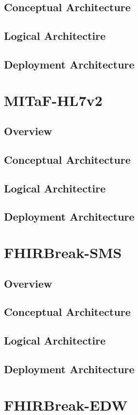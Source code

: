 \documentclass[a4paper]{book}
\begin{document}
\section{Conceptual Architecture}
\section{Logical Architectire}
\section{Deployment Architecture}

\chapter{MITaF-HL7v2}
\section{Overview}
\section{Conceptual Architecture}
\section{Logical Architectire}
\section{Deployment Architecture}

\chapter{FHIRBreak-SMS}
\section{Overview}
\section{Conceptual Architecture}
\section{Logical Architectire}
\section{Deployment Architecture}

\chapter{FHIRBreak-EDW}
\end{document}
